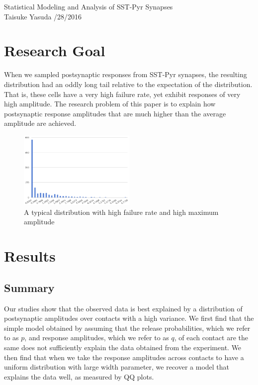 \documentclass{article}
\author{Taisuke Yasuda}
\begin{document}
\begin{center}
  {\LARGE Statistical Modeling and Analysis of SST-Pyr Synapses} \\
  \vspace{10pt}
  {Taisuke Yasuda /28/2016}
\end{center}

\section{Research Goal}
When we sampled postsynaptic responses from SST-Pyr synapses, the resulting distribution had an oddly long tail relative to the expectation of the distribution. That is, these cells have a very high failure rate, yet exhibit responses of very high amplitude. The research problem of this paper is to explain how postsynaptic response amplitudes that are much higher than the average amplitude are achieved.

\begin{figure}[h]
  \caption{A typical distribution with high failure rate and high maximum amplitude}
  \centering
  \includegraphics[width=0.5\textwidth]{typical-hist}
\end{figure}

\section{Results}
\subsection{Summary}
Our studies show that the observed data is best explained by a distribution of postsynaptic amplitudes over contacts with a high variance. We first find that the simple model obtained by assuming that the release probabilities, which we refer to as $p$, and response amplitudes, which we refer to as $q$, of each contact are the same does not sufficiently explain the data obtained from the experiment. We then find that when we take the response amplitudes across contacts to have a uniform distribution with large width parameter, we recover a model that explains the data well, as measured by QQ plots.
\end{document}
